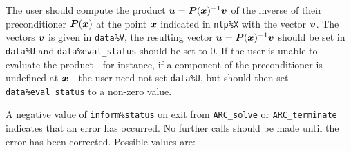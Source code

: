 \documentclass{galahad}
\newcommand{\packagename}{ARC}
\begin{document}
\begin{description}
 The user should compute the product ${\bm{u}} = {\bm{P}}({\bm{x}})^{-1}{\bm{v}}$
     of the inverse of their preconditioner ${\bm{P}}({\bm{x}})$ at the point ${\bm{x}}$
     indicated in {\tt nlp\%X} with the vector ${\bm{v}}$.
     The vectors ${\bm{v}}$ is given in {\tt data\%V}, the
     resulting vector ${\bm{u}} = {\bm{P}}({\bm{x}})^{-1} {\bm{v}}$ should be set in 
     {\tt data\%U} and {\tt data\%eval\_status}
     should be set to 0. If the user is unable to evaluate the product---for
     instance, if a component of the preconditioner is undefined at
     ${\bm{x}}$---the user need not set {\tt data\%U}, but should then set
     {\tt data\%eval\_status} to a non-zero value.

\end{description}



\galerrors
A negative value of {\tt inform\%status} on exit from
{\tt \packagename\_solve}
or
{\tt \packagename\_terminate}
indicates that an error has occurred. No further calls should be made
until the error has been corrected. Possible values are:
\end{document}
